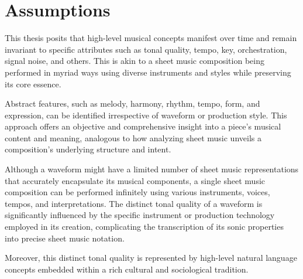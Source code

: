 \section{Assumptions}

This thesis posits that high-level musical concepts manifest over time and remain invariant to specific attributes such as tonal quality, tempo, key, orchestration, signal noise, and others. This is akin to a sheet music composition being performed in myriad ways using diverse instruments and styles while preserving its core essence.

Abstract features, such as melody, harmony, rhythm, tempo, form, and expression, can be identified irrespective of waveform or production style. This approach offers an objective and comprehensive insight into a piece's musical content and meaning, analogous to how analyzing sheet music unveils a composition's underlying structure and intent.

Although a waveform might have a limited number of sheet music representations that accurately encapsulate its musical components, a single sheet music composition can be performed infinitely using various instruments, voices, tempos, and interpretations. The distinct tonal quality of a waveform is significantly influenced by the specific instrument or production technology employed in its creation, complicating the transcription of its sonic properties into precise sheet music notation.

Moreover, this distinct tonal quality is represented by high-level natural language concepts embedded within a rich cultural and sociological tradition.